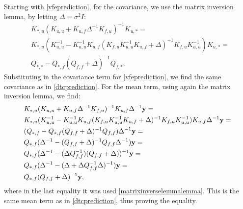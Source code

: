 Starting with \eqref{vfeprediction}, for the covariance, we use the matrix inversion lemma, by letting $\Delta = \sigma^2 I$:
\begin{equation*}
\begin{split}
 & K_{*,u}(K_{u,u} + K_{u,f} \Delta^{-1} K_{f,u})^{-1} K_{u,*} = \\
 & K_{*,u}(K_{u,u}^{-1} - K_{u,u}^{-1} K_{u,f} (K_{f,u} K_{u,u}^{-1} K_{u,f} + \Delta)^{-1} K_{f,u} K_{u,u}^{-1}) K_{u,*} = \\
 & Q_{*,*} - Q_{*,f}(Q_{f,f} + \Delta)^{-1} Q_{f,*}.
\end{split}
\end{equation*}
Substituting in the covariance term for \eqref{vfeprediction}, we find the same covariance as in \eqref{dtcprediction}. For the mean term, using again the matrix inversion lemma, we find:
\begin{equation*}
\begin{split}
& K_{*,u} (K_{u,u} + K_{u,f} \Delta^{-1} K_{f,u})^{-1} K_{u,f} \Delta^{-1} {\mathbf y} = \\
& K_{*,u} (K_{u,u}^{-1} - K_{u,u}^{-1} K_{u,f} (K_{f,u} K_{u,u}^{-1} K_{u,f} + \Delta)^{-1} K_{f,u} K_{u,u}^{-1}) K_{u,f} \Delta^{-1} {\mathbf y} = \\
& (Q_{*,f} - Q_{*,f}(Q_{f,f} + \Delta)^{-1} Q_{f,f}) \Delta^{-1} {\mathbf y} = \\
& Q_{*,f}(\Delta^{-1} - (Q_{f,f} + \Delta)^{-1} Q_{f,f} \Delta^{-1} ){\mathbf y} = \\
& Q_{*,f}(\Delta^{-1} - (\Delta Q_{f,f}^{-1})(Q_{f,f} + \Delta))^{-1} {\mathbf y} = \\
& Q_{*,f}(\Delta^{-1} - (\Delta + \Delta Q_{f,f}^{-1} \Delta)^{-1}) {\mathbf y} = \\
& Q_{*,f}(Q_{f,f} + \Delta)^{-1} {\mathbf y},
\end{split}
\end{equation*}
where in the last equality it was used \eqref{matrixinverselemmalemma}. This is the same mean term as in \eqref{dtcprediction}, thus proving the equality.
